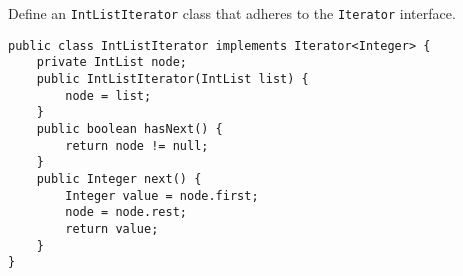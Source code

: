 \question Define an \texttt{IntListIterator} class that adheres to the \texttt{Iterator} interface.

\begin{solution}[5in]
\begin{lstlisting}
public class IntListIterator implements Iterator<Integer> {
    private IntList node;
    public IntListIterator(IntList list) {
        node = list;
    }
    public boolean hasNext() {
        return node != null;
    }
    public Integer next() {
        Integer value = node.first;
        node = node.rest;
        return value;
    }
}
\end{lstlisting}
\end{solution}